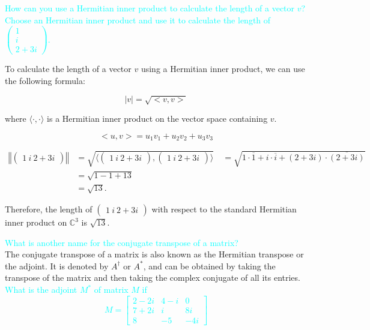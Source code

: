 \documentclass[fontsize=12pt]{scrartcl}
\begin{document}
\noindent
\textcolor{cyan}{How can you use a Hermitian inner product to calculate the length of a vector $v$? Choose an Hermitian inner product and use it to calculate the length of $\displaystyle{\begin{pmatrix} 1 \\ i \\ 2+3i \end{pmatrix}}$.}

To calculate the length of a vector $v$ using a Hermitian inner product, we can use the following formula:

$$|v| = \sqrt{<v, v>} $$

where $\langle\cdot,\cdot\rangle$ is a Hermitian inner product on the vector space containing $v$.

$$<u, v> = u_1v_1 + u_2v_2 + u_3v_3 $$

\begin{align*}
\left\Vert \begin{pmatrix} 1 \ i \ 2+3i \end{pmatrix} \right\Vert &= \sqrt{\langle \begin{pmatrix} 1 \ i \ 2+3i \end{pmatrix}, \begin{pmatrix} 1 \ i \ 2+3i \end{pmatrix}\rangle} \
&= \sqrt{1\cdot\overline{1}+i\cdot\overline{i}+(2+3i)\cdot\overline{(2+3i)}} \\
&= \sqrt{1-1+13} \\
&= \sqrt{13}.
\end{align*}

Therefore, the length of $\begin{pmatrix} 1 \ i \ 2+3i \end{pmatrix}$ with respect to the standard Hermitian inner product on $\mathbb{C}^3$ is $\sqrt{13}$.

\noindent
\textcolor{cyan}{What is another name for the conjugate transpose of a matrix?}\\
The conjugate transpose of a matrix is also known as the Hermitian transpose or the adjoint. It is denoted by $A^\dagger$ or $A^*$, and can be obtained by taking the transpose of the matrix and then taking the complex conjugate of all its entries.
\\

\textcolor{cyan}{What is the adjoint $M^*$ of matrix $M$ if $$M = \begin{bmatrix} 2-2i & 4-i & 0\\
7+2i & i & 8i\\
8 & -5 & -4i\end{bmatrix}$$}
\end{document}
